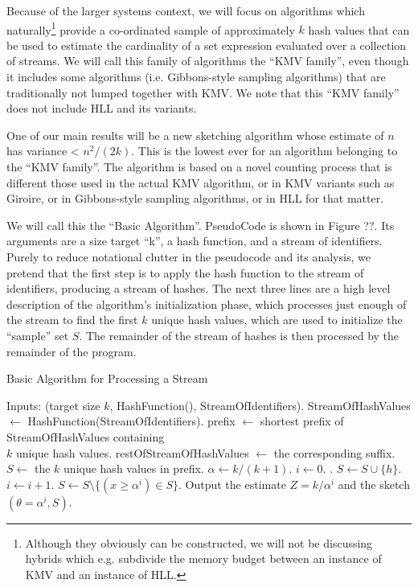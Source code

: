 \documentclass{sig-alternate}
\begin{document}
Because of the larger systems context, we will focus on algorithms which naturally\footnote{Although they obviously can be constructed,
we will not be discussing hybrids which e.g. subdivide the memory budget between an instance of KMV and an instance of HLL.}
provide a co-ordinated sample of approximately $k$ hash values that can be used to estimate the cardinality of a set expression evaluated
over a collection of streams. We will call this family of algorithms the ``KMV family'', even though it includes some algorithms (i.e. Gibbons-style
sampling algorithms) that are traditionally not lumped together with KMV. We note that this ``KMV family'' does not include HLL and its variants.

One of our main results will be a new sketching algorithm whose estimate of $n$ has variance < $n^2/(2k)$. This is the lowest ever for
an algorithm belonging to the ``KMV family''. The algorithm is based on a novel counting process that is different those used in the actual
KMV algorithm, or in KMV variants such as Giroire, or in Gibbons-style sampling algorithms, or in HLL for that matter.

We will call this the ``Basic Algorithm''. PseudoCode is shown in Figure ??. 
Its arguments are a size target ``k'', a hash function, and a stream of identifiers.
Purely to reduce notational clutter in the pseudocode and its analysis, we pretend that the
first step is to apply the hash function to the stream of identifiers, producing a stream of hashes.
The next three lines are a high level description of the algorithm's initialization phase,
which processes just enough of the stream to find the first $k$ unique hash values, which are used
to initialize the ``sample'' set $S$. The remainder of the stream of hashes is then processed by
the remainder of the program.

\begin{algorithm}[t]
\caption{Basic Algorithm for Processing a Stream}
\label{alg:basic-algorithm}
\begin{algorithmic}[1]{\footnotesize
\STATE Inputs: (target size $k$, HashFunction(), StreamOfIdentifiers).
\STATE StreamOfHashValues $ \leftarrow$  HashFunction(StreamOfIdentifiers).
\STATE prefix $\leftarrow$ shortest prefix of StreamOfHashValues containing \\ 
       \quad \quad \quad \quad \quad $k$ unique hash values.
\STATE restOfStreamOfHashValues $\leftarrow$ the corresponding suffix.
\STATE $S \leftarrow$ the $k$ unique hash values in prefix.
\STATE $\alpha \leftarrow k/(k+1)$.
\STATE $i \leftarrow 0$.
\STATE {}.
\STATE $S \leftarrow S \cup \{h\}$.
\STATE $i \leftarrow i + 1$.
\STATE $S \leftarrow S \setminus \{(x \ge \alpha^i) \in S\}$.
\ENDIF
\ENDFOR
\STATE Output the estimate $Z = k / \alpha^i$ and the sketch $(\theta = \alpha^i, S)$.
}\end{algorithmic}
\end{algorithm}
\end{document}
